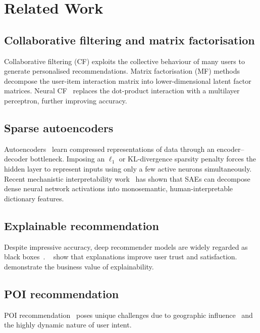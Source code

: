 \chapter{Related Work}
\label{chap:related_work}


\section{Collaborative filtering and matrix factorisation}

Collaborative filtering (CF) exploits the collective behaviour of many users to
generate personalised recommendations.
Matrix factorisation (MF) methods~\cite{koren2009matrix} decompose the
user-item interaction matrix into lower-dimensional latent factor matrices.
Neural CF~\cite{he2017neural} replaces the dot-product interaction with a
multilayer perceptron, further improving accuracy.

\section{Sparse autoencoders}

Autoencoders~\cite{ng2011sparse} learn compressed representations of data
through an encoder--decoder bottleneck.
Imposing an $\ell_1$ or KL-divergence sparsity penalty forces the hidden layer
to represent inputs using only a few active neurons simultaneously.
Recent mechanistic interpretability work~\cite{bricken2023monosemanticity}
has shown that SAEs can decompose dense neural network activations into
monosemantic, human-interpretable dictionary features.

\section{Explainable recommendation}


Despite impressive accuracy, deep recommender models are widely regarded as
black boxes~\cite{zhang2019deep}.
\citeauthor{knijnenburg2012explaining}~\cite{knijnenburg2012explaining} show
that explanations improve user trust and satisfaction.
\citeauthor{jannach2019measuring}~\cite{jannach2019measuring} demonstrate
the business value of explainability.

\section{POI recommendation}


POI recommendation~\cite{liu2017experimental} poses unique challenges due to
geographic influence~\cite{ye2011exploiting} and the highly dynamic nature of
user intent.
